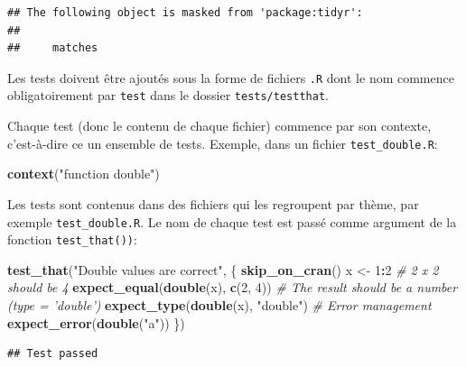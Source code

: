 \documentclass[
  12pt,
  french,
  a4paper,
  extrafontsizes,onecolumn,openright
  ]{memoir}
\newenvironment{Shaded}{\begin{snugshade}}{\end{snugshade}}
\newcommand{\CommentTok}[1]{\textcolor[rgb]{0.56,0.35,0.01}{\textit{#1}}}
\newcommand{\DecValTok}[1]{\textcolor[rgb]{0.00,0.00,0.81}{#1}}
\newcommand{\KeywordTok}[1]{\textcolor[rgb]{0.13,0.29,0.53}{\textbf{#1}}}
\newcommand{\NormalTok}[1]{#1}
\newcommand{\OperatorTok}[1]{\textcolor[rgb]{0.81,0.36,0.00}{\textbf{#1}}}
\newcommand{\StringTok}[1]{\textcolor[rgb]{0.31,0.60,0.02}{#1}}
\begin{document}
\begin{verbatim}
## The following object is masked from 'package:tidyr':
## 
##     matches
\end{verbatim}

\normalsize

Les tests doivent être ajoutés sous la forme de fichiers \texttt{.R} dont le nom commence obligatoirement par \texttt{test} dans le dossier \texttt{tests/testthat}.

Chaque test (donc le contenu de chaque fichier) commence par son contexte, c'est-à-dire ce un ensemble de tests. Exemple, dans un fichier \texttt{test\_double.R}:

\scriptsize

\begin{Shaded}
\begin{Highlighting}[]
\KeywordTok{context}\NormalTok{(}\StringTok{"function double"}\NormalTok{)}
\end{Highlighting}
\end{Shaded}

\normalsize

Les tests sont contenus dans des fichiers qui les regroupent par thème, par exemple \texttt{test\_double.R}.
Le nom de chaque test est passé comme argument de la fonction \texttt{test\_that())}:

\scriptsize

\begin{Shaded}
\begin{Highlighting}[]
\KeywordTok{test_that}\NormalTok{(}\StringTok{"Double values are correct"}\NormalTok{, \{}
    \KeywordTok{skip_on_cran}\NormalTok{()}
\NormalTok{    x <-}\StringTok{ }\DecValTok{1}\OperatorTok{:}\DecValTok{2}
    \CommentTok{# 2 x 2 should be 4}
    \KeywordTok{expect_equal}\NormalTok{(}\KeywordTok{double}\NormalTok{(x), }\KeywordTok{c}\NormalTok{(}\DecValTok{2}\NormalTok{, }\DecValTok{4}\NormalTok{))}
    \CommentTok{# The result should be a number (type = 'double')}
    \KeywordTok{expect_type}\NormalTok{(}\KeywordTok{double}\NormalTok{(x), }\StringTok{"double"}\NormalTok{)}
    \CommentTok{# Error management}
    \KeywordTok{expect_error}\NormalTok{(}\KeywordTok{double}\NormalTok{(}\StringTok{"a"}\NormalTok{))}
\NormalTok{\})}
\end{Highlighting}
\end{Shaded}

\begin{verbatim}
## Test passed
\end{verbatim}
\end{document}
